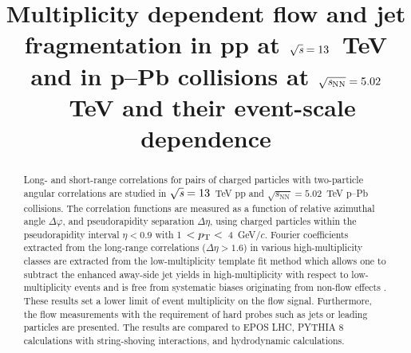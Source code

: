 \documentclass[ALICE,manyauthors]{cernphprep}
\begin{document}
\begin{titlepage}

\PHyear{}
\PHdate{\today}
%

\title{Multiplicity dependent flow and jet fragmentation in pp at ${\sqrt{{\textit s}}}=13$~TeV and in p--Pb collisions at ${\sqrt{{\textit s_\mathrm{NN}}}} = 5.02$~TeV and their event-scale dependence}


\begin{abstract}
%
Long- and short-range correlations for pairs of charged particles with two-particle angular correlations are studied in ${\sqrt{{\textit s}}}=13$~TeV pp and ${\sqrt{s_\mathrm{NN}}} = 5.02$~TeV p--Pb collisions. The correlation functions are measured as a function of relative azimuthal angle $\Delta\varphi$, and pseudorapidity separation $\Delta\eta$, using charged particles within the pseudorapidity interval $\eta < 0.9$ with 1~$ < p_\mathrm{T} < $~4~GeV/$c$.
Fourier coefficients extracted from the long-range correlations ($\Delta\eta > 1.6$) in various high-multiplicity classes are extracted from the low-multiplicity template fit method which allows one to subtract the enhanced away-side jet yields in high-multiplicity with respect to low-multiplicity events and is free from systematic biases originating from non-flow effects . These results set a lower limit of event multiplicity on the flow signal. Furthermore, the flow measurements with the requirement of hard probes such as jets or leading particles are presented. The results are compared to EPOS LHC, PYTHIA 8 calculations with string-shoving interactions, and hydrodynamic calculations.




\end{abstract}

\end{titlepage}

\setcounter{page}{2}
\end{document}
